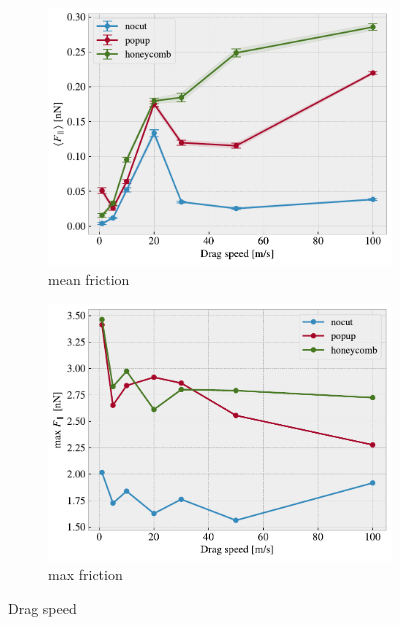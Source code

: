 \begin{figure}[H]
  \centering
  \begin{subfigure}[b]{0.49\textwidth}
      \centering
      \includegraphics[width=\textwidth]{figures/baseline/variables_vel_mean_K30.pdf}
      \caption{mean friction}
      \label{fig:var_vel_mean}
  \end{subfigure}
  \hfill
  \begin{subfigure}[b]{0.49\textwidth}
      \centering
      \includegraphics[width=\textwidth]{figures/baseline/variables_vel_max_K30.pdf}
      \caption{max friction}
      \label{fig:var_vel_max}
  \end{subfigure}
  \hfill
     \caption{Drag speed}
     \label{fig:var_vel}
\end{figure}

